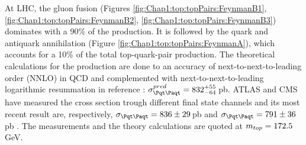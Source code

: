 At LHC, the gluon fusion (Figures \ref{fig:Chap1:top:topPairs:FeynmanB1}, 
\ref{fig:Chap1:top:topPairs:FeynmanB2}, \ref{fig:Chap1:top:topPairs:FeynmanB3}) dominates with a 90\% of 
the \ttbar production. It is followed by the quark and antiquark annihilation (Figure 
\ref{fig:Chap1:top:topPairs:FeynmanA}), which accounts for a 10\% of the total top-quark-pair production.
The theoretical calculations for the \ttbar 
production are done to an accuracy of  next-to-next-to-leading order (NNLO)
in QCD and complemented with next-to-next-to-leading logarithmic resummation in reference \cite{Czakon_2020}:
$\sigma^{pred}_{\ttbar} = 832^{+55}_{-64}\,$pb.
ATLAS and CMS have measured the cross section trough different final state channels and its most
recent result are, respectively, $\sigma_{\ttbar} = 836 \pm 29\,$pb \cite{ATLAS:2022qak} and $\sigma_{\ttbar} = 791 \pm 36\,$pb \cite{CMS:2021vhb}.
The measurements and the theory calculations are quoted at $m_{top}=172.5\,$GeV.


